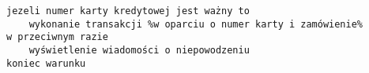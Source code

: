 \documentclass[a4paper,12pt]{book}
\begin{document}
	\begin{lstlisting}[numbers=none,escapechar=\%]
jezeli numer karty kredytowej jest ważny to
    wykonanie transakcji %w oparciu o numer karty i zamówienie%
w przeciwnym razie
    wyświetlenie wiadomości o niepowodzeniu
koniec warunku
	\end{lstlisting}
		
		
\end{document}
